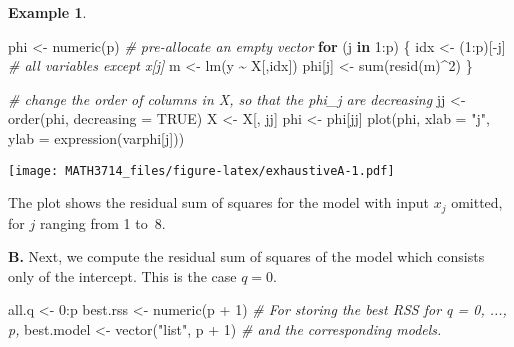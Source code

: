 \documentclass[
  a4paper,
]{article}
\newenvironment{Shaded}{\begin{snugshade}}{\end{snugshade}}
\newcommand{\AttributeTok}[1]{\textcolor[rgb]{0.77,0.63,0.00}{#1}}
\newcommand{\CommentTok}[1]{\textcolor[rgb]{0.56,0.35,0.01}{\textit{#1}}}
\newcommand{\ConstantTok}[1]{\textcolor[rgb]{0.00,0.00,0.00}{#1}}
\newcommand{\ControlFlowTok}[1]{\textcolor[rgb]{0.13,0.29,0.53}{\textbf{#1}}}
\newcommand{\DecValTok}[1]{\textcolor[rgb]{0.00,0.00,0.81}{#1}}
\newcommand{\FunctionTok}[1]{\textcolor[rgb]{0.00,0.00,0.00}{#1}}
\newcommand{\NormalTok}[1]{#1}
\newcommand{\OtherTok}[1]{\textcolor[rgb]{0.56,0.35,0.01}{#1}}
\newcommand{\SpecialCharTok}[1]{\textcolor[rgb]{0.00,0.00,0.00}{#1}}
\newcommand{\StringTok}[1]{\textcolor[rgb]{0.31,0.60,0.02}{#1}}
\theoremstyle{definition}
\theoremstyle{definition}
\newtheorem{example}{Example}[section]
\theoremstyle{definition}
\theoremstyle{definition}
\theoremstyle{remark}
\begin{document}
\begin{example}
\begin{Shaded}
\begin{Highlighting}[]
\NormalTok{phi }\OtherTok{\textless{}{-}} \FunctionTok{numeric}\NormalTok{(p) }\CommentTok{\# pre{-}allocate an empty vector}
\ControlFlowTok{for}\NormalTok{ (j }\ControlFlowTok{in} \DecValTok{1}\SpecialCharTok{:}\NormalTok{p) \{}
\NormalTok{    idx }\OtherTok{\textless{}{-}}\NormalTok{ (}\DecValTok{1}\SpecialCharTok{:}\NormalTok{p)[}\SpecialCharTok{{-}}\NormalTok{j] }\CommentTok{\# all variables except x[j]}
\NormalTok{    m }\OtherTok{\textless{}{-}} \FunctionTok{lm}\NormalTok{(y }\SpecialCharTok{\textasciitilde{}}\NormalTok{ X[,idx])}
\NormalTok{    phi[j] }\OtherTok{\textless{}{-}} \FunctionTok{sum}\NormalTok{(}\FunctionTok{resid}\NormalTok{(m)}\SpecialCharTok{\^{}}\DecValTok{2}\NormalTok{)}
\NormalTok{\}}

\CommentTok{\# change the order of columns in X, so that the phi\_j are decreasing}
\NormalTok{jj }\OtherTok{\textless{}{-}} \FunctionTok{order}\NormalTok{(phi, }\AttributeTok{decreasing =} \ConstantTok{TRUE}\NormalTok{)}
\NormalTok{X }\OtherTok{\textless{}{-}}\NormalTok{ X[, jj]}
\NormalTok{phi }\OtherTok{\textless{}{-}}\NormalTok{ phi[jj]}
\FunctionTok{plot}\NormalTok{(phi, }\AttributeTok{xlab =} \StringTok{"j"}\NormalTok{, }\AttributeTok{ylab =} \FunctionTok{expression}\NormalTok{(varphi[j]))}
\end{Highlighting}
\end{Shaded}

\texttt{[image: MATH3714\_files/figure-latex/exhaustiveA-1.pdf]}

The plot shows the residual sum of squares for the model with input \(x_j\)
omitted, for \(j\) ranging from 1 to~8.

\textbf{B.} Next, we compute the residual
sum of squares of the model which consists only of the intercept.
This is the case \(q = 0\).

\begin{Shaded}
\begin{Highlighting}[]
\NormalTok{all.q }\OtherTok{\textless{}{-}} \DecValTok{0}\SpecialCharTok{:}\NormalTok{p}
\NormalTok{best.rss }\OtherTok{\textless{}{-}} \FunctionTok{numeric}\NormalTok{(p }\SpecialCharTok{+} \DecValTok{1}\NormalTok{) }\CommentTok{\# For storing the best RSS for q = 0, ..., p,}
\NormalTok{best.model }\OtherTok{\textless{}{-}} \FunctionTok{vector}\NormalTok{(}\StringTok{"list"}\NormalTok{, p }\SpecialCharTok{+} \DecValTok{1}\NormalTok{) }\CommentTok{\# and the corresponding models.}


\end{Highlighting}
\end{Shaded}
\end{example}
\end{document}
